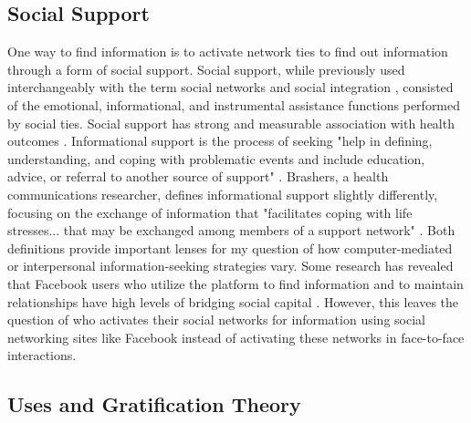 \subsection{Social Support}

One way to find information is to activate network ties to find out information
through a form of social support. Social support, while previously used
interchangeably with the term social networks and social integration
\citep{houseStructuresProcessesSocial1988}, consisted of the emotional, informational,
and instrumental assistance functions performed by social ties. Social 
support has strong and measurable association with health outcomes
\citep{houseMeasuresConceptsSocial1985, thoitsMechanismsLinkingSocial2011}.
Informational support is the process of seeking "help in defining,
understanding, and coping with problematic events and include education, advice,
or referral to another source of support" \citep[p. 640]{winemiller_etal93}.
Brashers, a health communications researcher, defines informational support
slightly differently, focusing on the exchange of information that "facilitates
coping with life stresses... that may be exchanged among members of a support
network" \citeyearpar[p. 260]{brashersInformationSeekingAvoiding2002}. Both
definitions provide important lenses for my question of how
computer-mediated or interpersonal information-seeking strategies vary. 
Some research has revealed that Facebook users who utilize the platform to 
find information and to maintain relationships have high levels of bridging
social capital \citep{liu2016meta}. However, this leaves the question 
of who activates their social networks for information using social networking 
sites like Facebook instead of activating these networks in face-to-face
interactions. 


\subsection{Uses and Gratification Theory}

